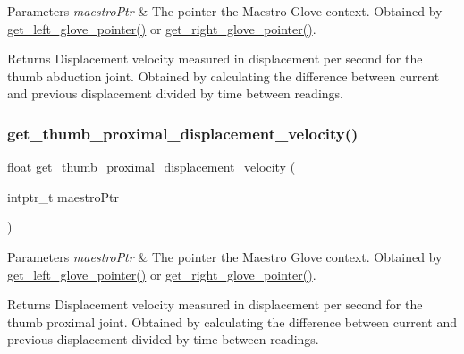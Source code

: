 \begin{DoxyParams}{Parameters}
{\em maestro\+Ptr} & The pointer the Maestro Glove context. Obtained by \hyperlink{group__glove_management_ga63ce3c99d4a8b8db851b22af9185764e}{get\+\_\+left\+\_\+glove\+\_\+pointer()} or \hyperlink{group__glove_management_ga9b8fd9d91aeac3f8da50f7a7eba0c32b}{get\+\_\+right\+\_\+glove\+\_\+pointer()}. \\
\hline
\end{DoxyParams}
\begin{DoxyReturn}{Returns}
Displacement velocity measured in displacement per second for the thumb abduction joint. Obtained by calculating the difference between current and previous displacement divided by time between readings. 
\end{DoxyReturn}
\mbox{\label{group__velocity_access_ga2a5bef0486e4cb5ef4181ecb3ef78ba5}} 
\subsubsection{\texorpdfstring{get\+\_\+thumb\+\_\+proximal\+\_\+displacement\+\_\+velocity()}{get\_thumb\_proximal\_displacement\_velocity()}}
{\footnotesize\ttfamily float get\+\_\+thumb\+\_\+proximal\+\_\+displacement\+\_\+velocity (\begin{DoxyParamCaption}\item[{intptr\+\_\+t}]{maestro\+Ptr }\end{DoxyParamCaption})}


\begin{DoxyParams}{Parameters}
{\em maestro\+Ptr} & The pointer the Maestro Glove context. Obtained by \hyperlink{group__glove_management_ga63ce3c99d4a8b8db851b22af9185764e}{get\+\_\+left\+\_\+glove\+\_\+pointer()} or \hyperlink{group__glove_management_ga9b8fd9d91aeac3f8da50f7a7eba0c32b}{get\+\_\+right\+\_\+glove\+\_\+pointer()}. \\
\hline
\end{DoxyParams}
\begin{DoxyReturn}{Returns}
Displacement velocity measured in displacement per second for the thumb proximal joint. Obtained by calculating the difference between current and previous displacement divided by time between readings. 
\end{DoxyReturn}
\mbox{\label{group__velocity_access_ga7d809526003fac45ee527df5e4bcb011}} 
